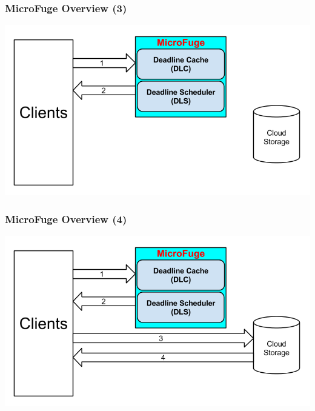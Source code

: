 \documentclass{beamer}
\begin{document}
\begin{frame}
  \frametitle{MicroFuge Overview (3)}
  \begin{center}
    \includegraphics[scale=0.39]{img/MF_FULL_V8_3.png}
  \end{center}
\end{frame}

\begin{frame}
  \frametitle{MicroFuge Overview (4)}
  \begin{center}
    \includegraphics[scale=0.39]{img/MF_FULL_V8_4.png}
  \end{center}
\end{frame}
\end{document}
